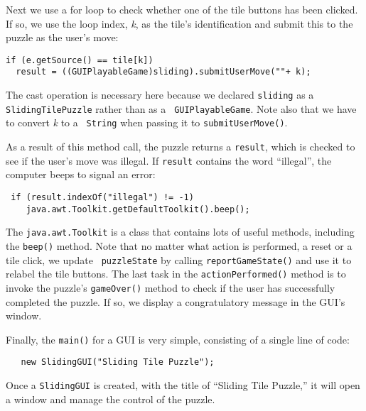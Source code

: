 Next we use a for loop to check whether one of the tile buttons has
been clicked.  If so, we use the loop index, {\em k}, as the tile's
identification and submit this to the puzzle as the user's move:

\begin{jjjlisting}[26.5pc]
\begin{lstlisting}
if (e.getSource() == tile[k])
  result = ((GUIPlayableGame)sliding).submitUserMove(""+ k);
\end{lstlisting}
\end{jjjlisting}

\noindent The cast operation is necessary here because we declared
{\tt sliding} as a {\tt SlidingTilePuzzle} rather than as a {\tt
GUIPlayableGame}.  Note also that we have to convert {\em k} to a {\tt
String} when passing it to {\tt submitUserMove()}. 

As a result of this method call, the puzzle returns a {\tt result},
which is checked to see if the user's move was illegal. If
{\tt result} contains the word ``illegal'', the computer beeps to signal an
error:

\begin{jjjlisting}
\begin{lstlisting}
 if (result.indexOf("illegal") != -1)
    java.awt.Toolkit.getDefaultToolkit().beep();
\end{lstlisting}
\end{jjjlisting}

\noindent The {\tt java.awt.Toolkit} is a class that contains lots of
useful methods, including the {\tt beep()} method. Note that no matter
what action is performed, a reset or a tile click, we update {\tt
puzzleState} by calling {\tt reportGameState()} and use it to relabel
the tile buttons.  The last task in the {\tt actionPerformed()} method
is to invoke the puzzle's {\tt gameOver()} method to check if the user
has successfully completed the puzzle. If so, we display a
congratulatory message in the GUI's window.

Finally, the {\tt main()} for a GUI is very simple, consisting of a
single line of code:

\begin{jjjlisting}
\begin{lstlisting}
   new SlidingGUI("Sliding Tile Puzzle");
\end{lstlisting}
\end{jjjlisting}

\noindent Once a {\tt SlidingGUI} is created, with the
title of ``Sliding Tile Puzzle,'' it will open a window
and manage the control of the puzzle.

